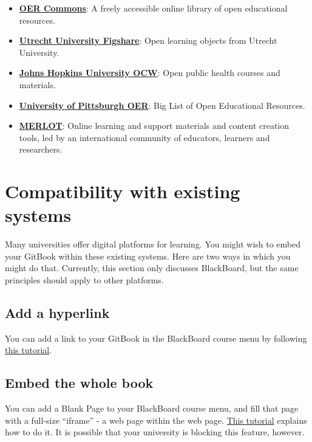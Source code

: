 \documentclass[
]{book}
\providecommand{\tightlist}{%
  \setlength{\itemsep}{0pt}\setlength{\parskip}{0pt}}
\begin{document}
\begin{itemize}
\tightlist
\item
  \href{https://www.oercommons.org/}{\textbf{OER Commons}}: A freely accessible online library of open educational resources.
\item
  \href{https://uu.figshare.com/}{\textbf{Utrecht University Figshare}}: Open learning objects from Utrecht University.
\item
  \href{https://ocw.jhsph.edu/}{\textbf{Johns Hopkins University OCW}}: Open public health courses and materials.
\item
  \href{https://pitt.libguides.com/openeducation/biglist}{\textbf{University of Pittsburgh OER}}: Big List of Open Educational Resources.
\item
  \href{https://www.merlot.org/merlot/}{\textbf{MERLOT}}: Online learning and support materials and content creation tools, led by an international community of educators, learners and researchers.
\end{itemize}

\hypertarget{compatibility-with-existing-systems}{%
\chapter{Compatibility with existing systems}\label{compatibility-with-existing-systems}}

Many universities offer digital platforms for learning. You might wish to embed your GitBook within these existing systems. Here are two ways in which you might do that. Currently, this section only discusses BlackBoard, but the same principles should apply to other platforms.

\hypertarget{add-a-hyperlink}{%
\section{Add a hyperlink}\label{add-a-hyperlink}}

You can add a link to your GitBook in the BlackBoard course menu by following \href{https://help.blackboard.com/Learn/Instructor/Course_Content/Create_Content/Create_Course_Materials/Link_to_Websites}{this tutorial}.

\hypertarget{embed-the-whole-book}{%
\section{Embed the whole book}\label{embed-the-whole-book}}

You can add a Blank Page to your BlackBoard course menu, and fill that page with a full-size ``iframe'' - a web page within the web page. \href{https://mycampus.maine.edu/web/uc-faculty-portal/education-technology/-/asset_publisher/vEKuFJYvDY5K/content/inserting-an-iframe-into-blackboard?inheritRedirect=false}{This tutorial} explains how to do it. It is possible that your university is blocking this feature, however.
\end{document}
